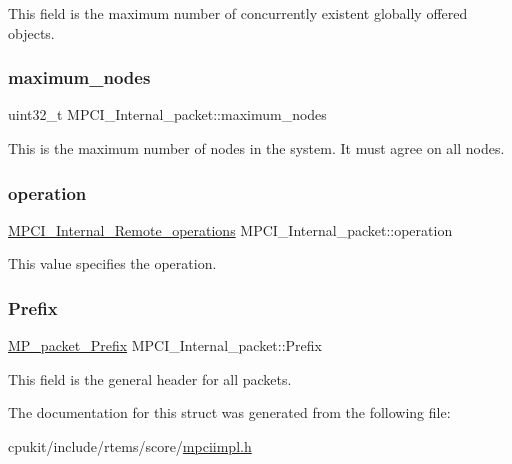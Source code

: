 This field is the maximum number of concurrently existent globally offered objects. \mbox{\label{structMPCI__Internal__packet_afa2ce9bc544da5cba034e25e4d16c3f8}} 
\subsubsection{\texorpdfstring{maximum\_nodes}{maximum\_nodes}}
{\footnotesize\ttfamily uint32\+\_\+t M\+P\+C\+I\+\_\+\+Internal\+\_\+packet\+::maximum\+\_\+nodes}

This is the maximum number of nodes in the system. It must agree on all nodes. \mbox{\label{structMPCI__Internal__packet_a851a809b25401ebcb0209791880f16df}} 
\subsubsection{\texorpdfstring{operation}{operation}}
{\footnotesize\ttfamily \mbox{\hyperlink{group__RTEMSScoreMPCI_ga04a2fa1c1617558e729e75700624cdb7}{M\+P\+C\+I\+\_\+\+Internal\+\_\+\+Remote\+\_\+operations}} M\+P\+C\+I\+\_\+\+Internal\+\_\+packet\+::operation}

This value specifies the operation. \mbox{\label{structMPCI__Internal__packet_a4309010f2f99b066b1c1d128b1bba8dc}} 
\subsubsection{\texorpdfstring{Prefix}{Prefix}}
{\footnotesize\ttfamily \mbox{\hyperlink{structMP__packet__Prefix}{M\+P\+\_\+packet\+\_\+\+Prefix}} M\+P\+C\+I\+\_\+\+Internal\+\_\+packet\+::\+Prefix}

This field is the general header for all packets. 

The documentation for this struct was generated from the following file\+:\begin{DoxyCompactItemize}
\item 
cpukit/include/rtems/score/\mbox{\hyperlink{mpciimpl_8h}{mpciimpl.\+h}}\end{DoxyCompactItemize}
